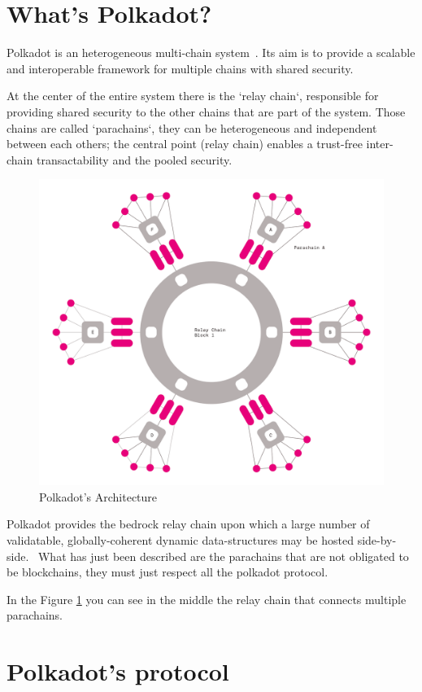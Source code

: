 \section{What's Polkadot?}

Polkadot is an heterogeneous multi-chain system~\cite{wood2016polkadot}. Its aim is to provide a scalable and interoperable framework for multiple chains with shared security.~\cite{burdges2020overview}

At the center of the entire system there is the `relay chain`, responsible for providing shared security to the other chains that are part of the system. Those chains are called `parachains`, they can be heterogeneous and independent between each others; the central point (relay chain) enables a trust-free inter-chain transactability and the pooled security.~\cite{burdges2020overview}

\begin{figure}[h]
  \centering
  \includegraphics[width=0.7\linewidth]{polkadot_architecture.png}
  \caption{Polkadot's Architecture}
  \label{fig:polkadot_arch}
\end{figure}

Polkadot provides the bedrock relay chain upon which a large number of validatable, globally-coherent dynamic data-structures may be hosted side-by-side.~\cite{wood2016polkadot} What has just been described are the parachains that are not obligated to be blockchains, they  must just respect all the polkadot protocol.

In the Figure \ref{fig:polkadot_arch} you can see in the middle the relay chain that connects multiple parachains.

\section{Polkadot's protocol}

